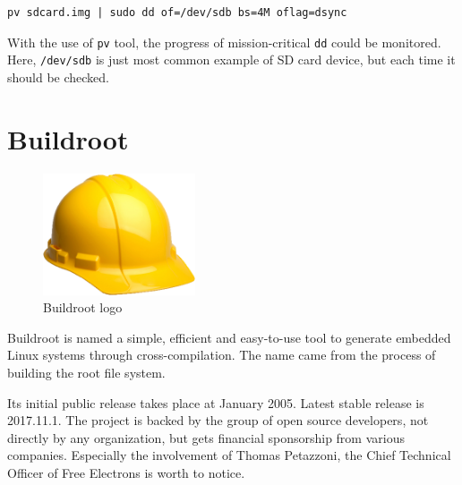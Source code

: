 \documentclass[printmode]{mgr}
\begin{document}
\begin{lstlisting}
pv sdcard.img | sudo dd of=/dev/sdb bs=4M oflag=dsync
\end{lstlisting}

With the use of \verb|pv| tool, the progress of mission-critical \verb|dd| could be monitored. Here, \verb|/dev/sdb| is just most common example of SD card device, but each time it should be checked.












\section{Buildroot}


\begin{figure}[htbp]
  \centering
    \includegraphics[width=0.4\textwidth]{buildroot-logo.png}
    \caption{Buildroot logo}
  \label{fig:buildroot-logo}
\end{figure}

Buildroot is named a simple, efficient and easy-to-use tool to generate embedded Linux systems through cross-compilation. The name came from the process of building the root file system.

Its initial public release takes place at January 2005. Latest stable release is 2017.11.1. The project is backed by the group of open source developers, not directly by any organization, but gets financial sponsorship from various companies. Especially the involvement of Thomas Petazzoni, the Chief Technical Officer of Free Electrons is worth to notice.\cite{web:buildroot-tpetazzoni}
\end{document}

